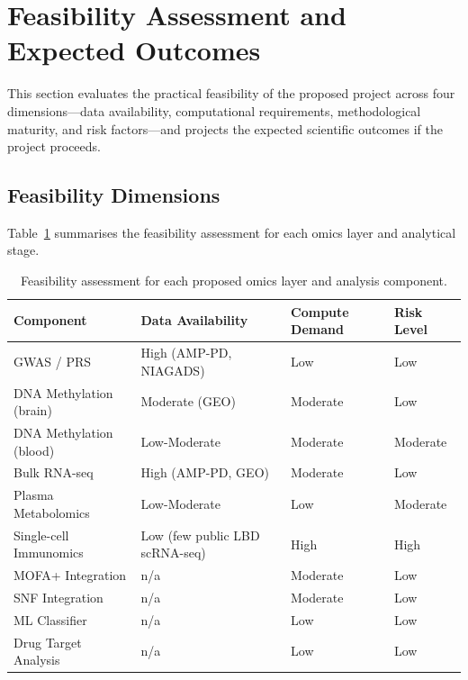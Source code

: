 \section{Feasibility Assessment and Expected Outcomes}
\label{sec:results}

This section evaluates the practical feasibility of the proposed project across four dimensions---data availability, computational requirements, methodological maturity, and risk factors---and projects the expected scientific outcomes if the project proceeds.

\subsection{Feasibility Dimensions}

Table~\ref{tab:feasibility} summarises the feasibility assessment for each omics layer and analytical stage.

\begin{table}[h!]
\centering
\caption{Feasibility assessment for each proposed omics layer and analysis component.}
\label{tab:feasibility}
\begin{tabular}{@{}p{2.5cm}p{2.2cm}p{1.4cm}p{1.8cm}@{}}
\toprule
\textbf{Component} & \textbf{Data Availability} & \textbf{Compute Demand} & \textbf{Risk Level} \\
\midrule
GWAS / PRS & High (AMP-PD, NIAGADS) & Low & Low \\
DNA Methylation (brain) & Moderate (GEO) & Moderate & Low \\
DNA Methylation (blood) & Low-Moderate & Moderate & Moderate \\
Bulk RNA-seq & High (AMP-PD, GEO) & Moderate & Low \\
Plasma Metabolomics & Low-Moderate & Low & Moderate \\
Single-cell Immunomics & Low (few public LBD scRNA-seq) & High & High \\
MOFA+ Integration & n/a & Moderate & Low \\
SNF Integration & n/a & Moderate & Low \\
ML Classifier & n/a & Low & Low \\
Drug Target Analysis & n/a & Low & Low \\
\bottomrule
\end{tabular}
\end{table}

